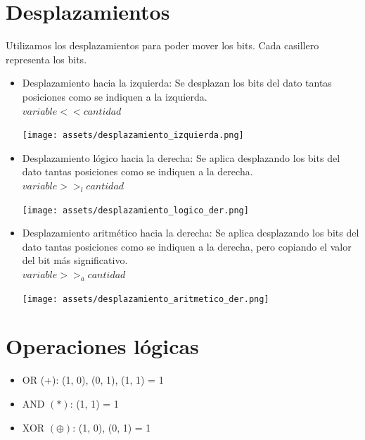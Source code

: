 \documentclass[10pt,a4paper]{article}
\begin{document}
\section{Desplazamientos}
Utilizamos los desplazamientos para poder mover los bits. Cada casillero representa los bits.
\begin{itemize}
    \item Desplazamiento hacia la izquierda: Se desplazan los bits del dato tantas posiciones como se indiquen a la izquierda. \\
     \(variable << cantidad\)\\ \begin{minipage}[b]{0.32\textwidth}
        \texttt{[image: assets/desplazamiento\_izquierda.png]}
        \label{fig:desplazamiento_izquierda}
    \end{minipage}

    \item Desplazamiento lógico hacia la derecha: Se aplica desplazando los bits del dato tantas posiciones como se indiquen a la derecha. \\
    \(variable >>_{l} cantidad\)\\ \begin{minipage}[b]{0.3\textwidth}
            \texttt{[image: assets/desplazamiento\_logico\_der.png]}
            \label{fig:desplazamiento_der_logico}
        \end{minipage}

    \item Desplazamiento aritmético hacia la derecha: Se aplica desplazando los bits del dato tantas posiciones como se indiquen a la derecha, pero copiando el valor del bit más significativo. \\
     \(variable >>_{a} cantidad\)\\ \begin{minipage}[b]{0.33\textwidth}
            \texttt{[image: assets/desplazamiento\_aritmetico\_der.png]}
            \label{fig:desplazamiento_der_aritmetico}
        \end{minipage}

\end{itemize} 

\newpage
\section{Operaciones lógicas}
\begin{itemize}
\item OR (+): (1, 0), (0, 1), (1, 1) = 1
\item AND \((\ast)\): (1, 1) = 1
\item XOR \((\oplus)\): (1, 0), (0, 1) = 1
\end{itemize} 
\end{document}

